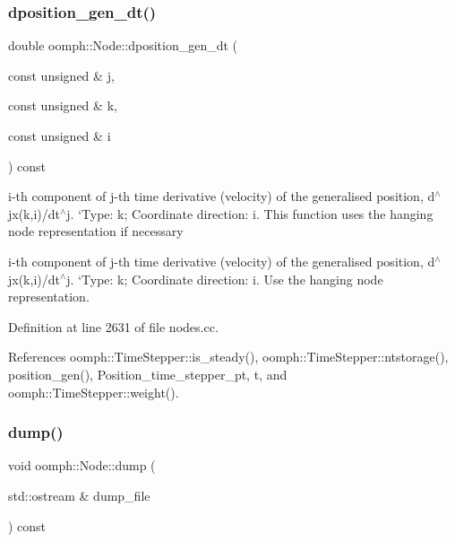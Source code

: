 \mbox{\label{classoomph_1_1Node_ae2528428e2fd8fedf035a54e63cee692}} 
\subsubsection{\texorpdfstring{dposition\+\_\+gen\+\_\+dt()}{dposition\_gen\_dt()}\hspace{0.1cm}{\footnotesize\ttfamily [2/2]}}
{\footnotesize\ttfamily double oomph\+::\+Node\+::dposition\+\_\+gen\+\_\+dt (\begin{DoxyParamCaption}\item[{const unsigned \&}]{j,  }\item[{const unsigned \&}]{k,  }\item[{const unsigned \&}]{i }\end{DoxyParamCaption}) const}



i-\/th component of j-\/th time derivative (velocity) of the generalised position, d$^\wedge$jx(k,i)/dt$^\wedge$j. `\+Type\textquotesingle{}\+: k; Coordinate direction\+: i. This function uses the hanging node representation if necessary 

i-\/th component of j-\/th time derivative (velocity) of the generalised position, d$^\wedge$jx(k,i)/dt$^\wedge$j. `\+Type\textquotesingle{}\+: k; Coordinate direction\+: i. Use the hanging node representation. 

Definition at line 2631 of file nodes.\+cc.



References oomph\+::\+Time\+Stepper\+::is\+\_\+steady(), oomph\+::\+Time\+Stepper\+::ntstorage(), position\+\_\+gen(), Position\+\_\+time\+\_\+stepper\+\_\+pt, t, and oomph\+::\+Time\+Stepper\+::weight().

\mbox{\label{classoomph_1_1Node_acd8bb142619d639d9bbfe813d0ba08df}} 
\subsubsection{\texorpdfstring{dump()}{dump()}}
{\footnotesize\ttfamily void oomph\+::\+Node\+::dump (\begin{DoxyParamCaption}\item[{std\+::ostream \&}]{dump\+\_\+file }\end{DoxyParamCaption}) const\hspace{0.3cm}{\ttfamily [virtual]}}



